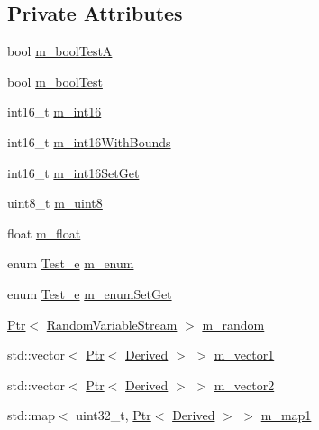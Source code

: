 \subsection*{Private Attributes}
\begin{DoxyCompactItemize}
\item 
bool \hyperlink{classAttributeObjectTest_a30a1aa0090d0f1d541d24b18c8421a1a}{m\+\_\+bool\+TestA}
\item 
bool \hyperlink{classAttributeObjectTest_a0bec303f1c438a7f6d867e3cdeb0807f}{m\+\_\+bool\+Test}
\item 
int16\+\_\+t \hyperlink{classAttributeObjectTest_a33942d25e282109f9717ba0a559277af}{m\+\_\+int16}
\item 
int16\+\_\+t \hyperlink{classAttributeObjectTest_a93968ba47eb5db65b4689fb8567c7e5f}{m\+\_\+int16\+With\+Bounds}
\item 
int16\+\_\+t \hyperlink{classAttributeObjectTest_a227c25d54a107d21036120744cacd153}{m\+\_\+int16\+Set\+Get}
\item 
uint8\+\_\+t \hyperlink{classAttributeObjectTest_ae68ba9c7949cafa9169d690fc1ffb3d3}{m\+\_\+uint8}
\item 
float \hyperlink{classAttributeObjectTest_ae0995453d0082af8f7658361fa3f094a}{m\+\_\+float}
\item 
enum \hyperlink{classAttributeObjectTest_a7d0dfe3f27ac6d9338a92781caf287cb}{Test\+\_\+e} \hyperlink{classAttributeObjectTest_afee8b6c35ed8175074c974a16b1a14a8}{m\+\_\+enum}
\item 
enum \hyperlink{classAttributeObjectTest_a7d0dfe3f27ac6d9338a92781caf287cb}{Test\+\_\+e} \hyperlink{classAttributeObjectTest_a0edc2742b26904c31535143df858a110}{m\+\_\+enum\+Set\+Get}
\item 
\hyperlink{classns3_1_1Ptr}{Ptr}$<$ \hyperlink{classns3_1_1RandomVariableStream}{Random\+Variable\+Stream} $>$ \hyperlink{classAttributeObjectTest_a2cd598372304f8001e148640239cbe6d}{m\+\_\+random}
\item 
std\+::vector$<$ \hyperlink{classns3_1_1Ptr}{Ptr}$<$ \hyperlink{classDerived}{Derived} $>$ $>$ \hyperlink{classAttributeObjectTest_a5102acf958f53a14bdddbeac1eaf7db2}{m\+\_\+vector1}
\item 
std\+::vector$<$ \hyperlink{classns3_1_1Ptr}{Ptr}$<$ \hyperlink{classDerived}{Derived} $>$ $>$ \hyperlink{classAttributeObjectTest_ae9b70d67367448bc838d64f98a53a9d7}{m\+\_\+vector2}
\item 
std\+::map$<$ uint32\+\_\+t, \hyperlink{classns3_1_1Ptr}{Ptr}$<$ \hyperlink{classDerived}{Derived} $>$ $>$ \hyperlink{classAttributeObjectTest_a21c039a81755803a31e1a487961a993d}{m\+\_\+map1}

\end{DoxyCompactItemize}
